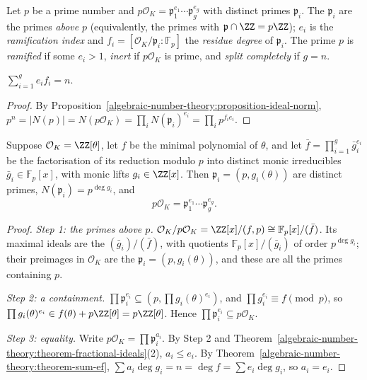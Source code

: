 \begin{definition}\label{algebraic-number-theory:definition-ramification}
Let $p$ be a prime number and $p\mathcal{O}_K = \mathfrak{p}_1^{e_1}\cdots\mathfrak{p}_g^{e_g}$ with distinct primes $\mathfrak{p}_i$. The $\mathfrak{p}_i$ are the primes \emph{above} $p$ (equivalently, the primes with
$\mathfrak{p} \cap \ZZ = p\ZZ$); $e_i$ is the \emph{ramification index} and $f_i = [\mathcal{O}_K/\mathfrak{p}_i : \mathbb{F}_p]$ the \emph{residue degree} of $\mathfrak{p}_i$. The prime $p$ is \emph{ramified} if some
$e_i > 1$, \emph{inert} if $p\mathcal{O}_K$ is prime, and \emph{split completely} if $g = n$.
\end{definition}

\begin{theorem}\label{algebraic-number-theory:theorem-sum-ef}
$\sum_{i=1}^ge_if_i = n$.
\end{theorem}

\begin{proof}
By Proposition~\ref{algebraic-number-theory:proposition-ideal-norm}, $p^n = |N(p)| = N(p\mathcal{O}_K) = \prod_iN(\mathfrak{p}_i)^{e_i} = \prod_ip^{f_ie_i}$.
\end{proof}

\begin{theorem}\label{algebraic-number-theory:theorem-kummer-dedekind}
Suppose $\mathcal{O}_K = \ZZ[\theta]$, let $f$ be the minimal polynomial of $\theta$, and let $\bar f = \prod_{i=1}^g\bar g_i^{e_i}$ be the factorisation of its reduction modulo $p$ into distinct monic
irreducibles $\bar g_i \in \mathbb{F}_p[x]$, with monic lifts $g_i \in \ZZ[x]$. Then $\mathfrak{p}_i = (p, g_i(\theta))$ are distinct primes, $N(\mathfrak{p}_i) = p^{\deg g_i}$, and
\[
p\mathcal{O}_K = \mathfrak{p}_1^{e_1}\cdots\mathfrak{p}_g^{e_g}.
\]
\end{theorem}

\begin{proof}
\emph{Step 1: the primes above $p$.} $\mathcal{O}_K/p\mathcal{O}_K = \ZZ[x]/(f, p) \cong \mathbb{F}_p[x]/(\bar f)$. Its maximal ideals are the $(\bar g_i)/(\bar f)$, with quotients
$\mathbb{F}_p[x]/(\bar g_i)$ of order $p^{\deg g_i}$; their preimages in $\mathcal{O}_K$ are the $\mathfrak{p}_i = (p, g_i(\theta))$, and these are all the primes containing $p$.

\emph{Step 2: a containment.} $\prod\mathfrak{p}_i^{e_i} \subseteq (p, \prod g_i(\theta)^{e_i})$, and $\prod g_i^{e_i} \equiv f \pmod p$, so $\prod g_i(\theta)^{e_i} \in f(\theta) + p\ZZ[\theta] = p\ZZ[\theta]$.
Hence $\prod\mathfrak{p}_i^{e_i} \subseteq p\mathcal{O}_K$.

\emph{Step 3: equality.} Write $p\mathcal{O}_K = \prod\mathfrak{p}_i^{a_i}$. By Step 2 and Theorem~\ref{algebraic-number-theory:theorem-fractional-ideals}(2), $a_i \leq e_i$. By
Theorem~\ref{algebraic-number-theory:theorem-sum-ef}, $\sum a_i\deg g_i = n = \deg f = \sum e_i\deg g_i$, so $a_i = e_i$.
\end{proof}

